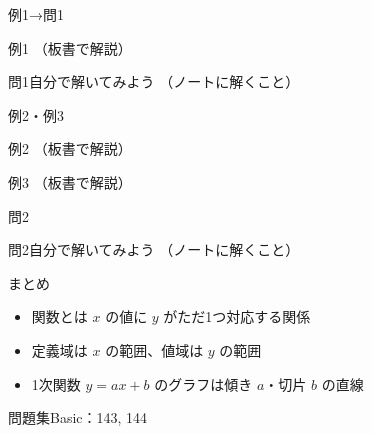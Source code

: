 \begin{frame}{例1→問1}
  \begin{exampleblock}{例1}
    （板書で解説）
  \end{exampleblock}

  \vfill

  \begin{block}{問1\quad 自分で解いてみよう}
    （ノートに解くこと）
  \end{block}
\end{frame}

\begin{frame}{例2・例3}
  \begin{exampleblock}{例2}
    （板書で解説）
  \end{exampleblock}

  \vfill

  \begin{exampleblock}{例3}
    （板書で解説）
  \end{exampleblock}
\end{frame}

\begin{frame}{問2}
  \begin{block}{問2\quad 自分で解いてみよう}
    （ノートに解くこと）
  \end{block}
\end{frame}

\begin{frame}{まとめ}
  \begin{itemize}
    \item 関数とは $x$ の値に $y$ がただ1つ対応する関係
    \item 定義域は $x$ の範囲、値域は $y$ の範囲
    \item 1次関数 $y=ax+b$ のグラフは傾き $a$・切片 $b$ の直線
  \end{itemize}

  \vfill
  {\small 問題集Basic：143, 144}
\end{frame}
